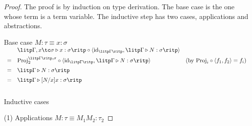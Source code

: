 \begin{proof}\mbox\\

The proof is by induction on type derivation. The base case is the one whose term is a term variable. The inductive step has two cases, applications and abstractions.

Base case $ M: \tau \equiv x: \sigma $ \\[5pt]
$
\begin{array}{rll}
   & \litp \Gamma , x \tc \sigma \triangleright x: \sigma \ritp \circ \langle \text{id}_{\litp \Gamma \ritp} , \litp \Gamma \triangleright N: \sigma \ritp \rangle & \\[5pt]
 = & \text{Proj}_2^{\litp \Gamma \ritp , \sigma} \circ \langle \text{id}_{\litp \Gamma \ritp} , \litp \Gamma \triangleright N: \sigma \ritp \rangle & (\text{by } \text{Proj}_i \circ \langle f_1, f_2 \rangle = f_i ) \\[5pt]
 = & \litp \Gamma \triangleright N: \sigma \ritp & \\[5pt]
 = & \litp \Gamma \triangleright [N/x]x: \sigma \ritp & \\[10pt]
\end{array}
$

Inductive cases

(1) Applications $ M: \tau \equiv M_1 M_2 : \tau_2 $


\end{proof}
